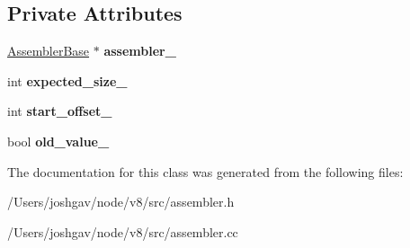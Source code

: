\subsection*{Private Attributes}
\begin{DoxyCompactItemize}
\item 
\hyperlink{classv8_1_1internal_1_1_assembler_base}{Assembler\+Base} $\ast$ {\bfseries assembler\+\_\+}\hypertarget{classv8_1_1internal_1_1_predictable_code_size_scope_a10860aaeed45521d05ec76e18281c326}{}\label{classv8_1_1internal_1_1_predictable_code_size_scope_a10860aaeed45521d05ec76e18281c326}

\item 
int {\bfseries expected\+\_\+size\+\_\+}\hypertarget{classv8_1_1internal_1_1_predictable_code_size_scope_a95ffde392317fc52a5b61b1cc5979b64}{}\label{classv8_1_1internal_1_1_predictable_code_size_scope_a95ffde392317fc52a5b61b1cc5979b64}

\item 
int {\bfseries start\+\_\+offset\+\_\+}\hypertarget{classv8_1_1internal_1_1_predictable_code_size_scope_a1286c704fafc17559e43301a4caeab25}{}\label{classv8_1_1internal_1_1_predictable_code_size_scope_a1286c704fafc17559e43301a4caeab25}

\item 
bool {\bfseries old\+\_\+value\+\_\+}\hypertarget{classv8_1_1internal_1_1_predictable_code_size_scope_a57be18f4485139354e424a8b091db670}{}\label{classv8_1_1internal_1_1_predictable_code_size_scope_a57be18f4485139354e424a8b091db670}

\end{DoxyCompactItemize}


The documentation for this class was generated from the following files\+:\begin{DoxyCompactItemize}
\item 
/\+Users/joshgav/node/v8/src/assembler.\+h\item 
/\+Users/joshgav/node/v8/src/assembler.\+cc\end{DoxyCompactItemize}
